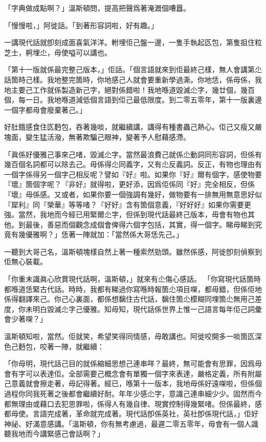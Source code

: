 「字典做成點啊？」溫斯頓問，提高把聲爲著淹漑個嘈囂。

「慢慢啦，」阿徙話。「到著形容詞啦，好有趣。」

一講現代話就卽刻成面喜氣洋洋。軵埋佢己盤一邊，一隻手執起匛包，第隻抯住粒芝士，䠻埋尐，毋使嗌可以講也。

「第十一版就係最完整己版本，」佢話。「個言語就來到佢最終己樣，無人會講第尐話箇時己樣。我地整完箇時，你地感己人就會要重新學過澌。你地恁，係毋係，我地主要己工作就係製造新己字，絕對係錯啦！我地喺道毀滅尐字，幾廿個，幾百個，每一日。我地喺道減低個言語到佢己最低限度。到二零五零年，第十一版裏邊一個字都毋會廢棄著己。」

好肚餓感食住匛麪包，吞著幾啖，就繼續講，講得有種書蟲己熱心。佢己又瘦又嚴塊面，變生猛活潑，無著欺騙己眼神，變著予人慰藉感滯。

「眞係好優雅己事來己啫，毀滅尐字。當然最浪費己就係尐動詞同形容詞，但係有幾百個名詞都可以除去己。毋係得尐同義字，又有尐反義詞。反正，有物也理由有一個字係得另一個字己相反呢？譬如『好』啦。如果你『好』爾有個字，感使物要『壞』箇個字呢？『非好』就得啦，更好添，因爲佢係同『好』完全相反，但係『壞』毋係感。又或者，如果你要一個強調有幾好，做物要有一排無用無意思好似『犀利』同『榮華』等等啫？『好好』含有箇個意義，『好好好』如果你需要更強。當然，我地而今經已用緊爾尐字，但係到現代話最終己版本，毋會有物也其他。到最後，善惡而個觀念成個會俾得六個字包括，其實，得一個字。睇毋睇到究竟有幾優雅啊？」恁著一陣就加：「當然係大哥恁先己。」

一聽到大哥己名，溫斯頓塊樣自然上著一種索然勁頭。雖然係感，阿徙卽刻偵察到佢無心裝載。

「你重未識眞心欣賞現代話啊，溫斯頓，」就來有尐傷心感話。 「你寫現代話箇時都喺道恁緊古代話。時時，我都有睇過你寫喺時報箇尐項目㗎，都毋錯，但係佢地係得翻譯來己。你己心裏面，都係想黐住古代話，黐住箇尐模糊同埋箇尐無用己差度，你未明白毀滅尐字己優雅。知毋知，現代話係世界上惟一己語言每年佢己詞彙會少著㗎？」

溫斯頓知啦，當然。佢就笑，希望笑得同情感，毋敢講也。阿徙咬開多一啖箇匛深色己麪包，咬著一陣，就繼續：

「你毋明，現代話己目的就係縮細思想己連串咩？最終，無可能會有思罪，因爲毋會有字可以表達佢。全部需要己概念會有單獨一個字來表達，嚴格定義，所有附屬己意義就會擦走著，毋記得著。經已，喺第十一版本，我地毋係好遠㗎啦，但係個過程你同我死著之後都會繼續好耐。年年少感尐字，意識己連串細少少。固然而今都無理由或藉口去犯思罪啦，係得人有幾自律、現實控制得幾緊啫。但係最終，感都毋使。言語完成著，革命就完成著。現代話卽係英社，英社卽係現代話，」佢好神祕、好滿意感講。「溫斯頓，你有無考慮過，最遲二零五零年，毋會有一個人識聽我地而今講緊感己會話啊？」

